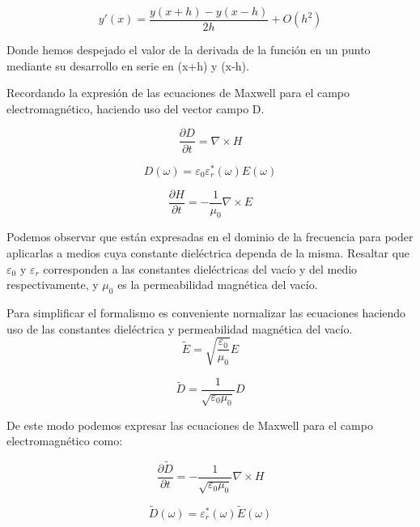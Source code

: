 \documentclass[11pt,a4paper,twoside,pdf]{article}
\numberwithin{equation}{section}
\begin{document}
\begin{equation}
y\prime(x)=\frac{y(x+h)-y(x-h)}{2h}+O(h^2)
\end{equation}

Donde hemos despejado el valor de la derivada de la función en un punto mediante su desarrollo en serie en (x+h) y (x-h).

Recordando la expresión de las ecuaciones de Maxwell para el campo electromagnético, haciendo uso del vector campo D.

\begin{equation}
\frac{\partial D}{\partial t}=\nabla \times H
\end{equation}

\begin{equation}
D(\omega)=\varepsilon_{0}\varepsilon^*_{r}(\omega)E(\omega)
\end{equation}

\begin{equation}
\frac{\partial H}{\partial t}=-\frac{1}{\mu_{0}}\nabla \times E
\end{equation}

Podemos observar que están expresadas en el dominio de la frecuencia para poder aplicarlas a medios cuya constante dieléctrica dependa de la misma. Resaltar que $\varepsilon_{0}$ y $\varepsilon_{r}$ corresponden a las constantes dieléctricas del vacío y del medio respectivamente, y $\mu_{0}$ es la permeabilidad magnética del vacío.


Para simplificar el formalismo es conveniente normalizar las ecuaciones haciendo uso de las constantes dieléctrica y permeabilidad magnética del vacío.
\begin{equation}
\tilde{E}=\sqrt{\frac{\varepsilon_{0}}{\mu_{0}}}E
\end{equation}

\begin{equation}
\tilde{D}=\frac{1}{\sqrt{\varepsilon_{0}\mu_{0}}}D
\end{equation}

De este modo podemos expresar las ecuaciones de Maxwell para el campo electromagnético como:

\begin{equation}
\frac{\partial \tilde{D}}{\partial t}=-\frac{1}{\sqrt{\varepsilon_{0}\mu_{0}}}\nabla \times H
\end{equation}

\begin{equation}
\tilde{D}(\omega)=\varepsilon^*_{r}(\omega)\tilde{E}(\omega)
\end{equation}
\end{document}
